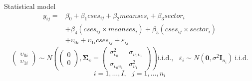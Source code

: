 \documentclass{beamer}
\newcommand{\vect}[1]{\mathbf{#1}}
\newcommand{\mat}[1]{\mathbf{#1}}
\newcommand{\gmat}[1]{\boldsymbol{#1}}
\begin{document}
\begin{frame}{Statistical model}
  \begin{align*}
    y_{ij} = & \beta_{0} + \beta_{1}cses_{ij} + \beta_{2}meanses_{i} +
    \beta_{3}sector_{i}\\
    & + \beta_{4}(cses_{ij} \times meanses_i) +
    \beta_5(cses_{ij}\times sector_i)\\
    & + \upsilon_{0i} + \upsilon_{1i}cses_{ij} + \varepsilon_{ij}
  \end{align*}
  \[
    \begin{pmatrix}
      \upsilon_{0i} \\
      \upsilon_{1i}
    \end{pmatrix}
    \sim N\left(
    \begin{pmatrix}
      0 \\
      0
    \end{pmatrix},
    \gmat{\Sigma}_{\upsilon} = 
    \begin{pmatrix}
      \sigma_{\upsilon_{0}}^2 & \sigma_{\upsilon_{0}\upsilon_1} \\
      \sigma_{\upsilon_{0}\upsilon_1} & \sigma_{\upsilon_{1}}^2
    \end{pmatrix}
    \right) \text{i.i.d.},~~~\varepsilon_i \sim N(\vect{0}, \sigma^2
    \mat{I}_{n_i})~\text{i.i.d.}
  \]
  \[
    i = 1,\dots,I, ~~~ j=1,\dots,n_i
  \]

\end{frame}
\end{document}

